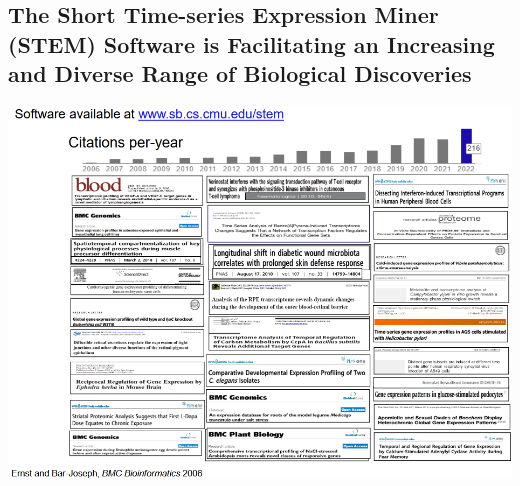 \documentclass[10pt]{article}
\begin{document}
\subsection*{The Short Time-series Expression Miner (STEM) Software is Facilitating an Increasing and Diverse Range of Biological Discoveries}
\begin{center}
    \includegraphics*[width=\textwidth]{W6_49.png}
\end{center}    
\end{document}
